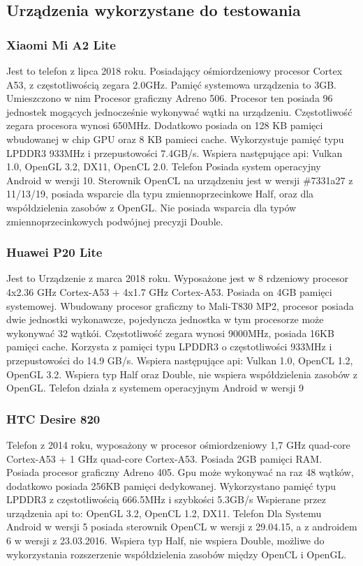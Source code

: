 	
\subsection[Urządzenia wykorzystane do testowania]{Urządzenia wykorzystane do testowania}
\subsubsection[Xiaomi Mi A2 Lite]{Xiaomi Mi A2 Lite}
Jest to telefon z lipca 2018 roku. Posiadający ośmiordzeniowy procesor Cortex A53, z częstotliwością zegara 2.0GHz. Pamięć systemowa urządzenia to 3GB. Umieszczono w nim Procesor graficzny Adreno 506. Procesor ten posiada 96 jednostek mogących jednocześnie wykonywać wątki na urządzeniu. Częstotliwość zegara procesora wynosi 650MHz. Dodatkowo posiada on 128 KB pamięci wbudowanej w chip GPU oraz 8 KB pamieci cache. Wykorzystuje pamięć typu LPDDR3 933MHz i przepustowości 7.4GB/s. Wspiera następujące api: Vulkan 1.0, OpenGL 3.2, DX11, OpenCL 2.0. Telefon Posiada system operacyjny Android w wersji 10. Sterownik OpenCL na urządzeniu jest w wersji \#7331a27 z 11/13/19, posiada wsparcie dla typu zmiennoprzecinkowe Half, oraz dla współdzielenia zasobów z OpenGL. Nie posiada wsparcia dla typów zmiennoprzecinkowych podwójnej precyzji Double.
\subsubsection[Huawei P20 Lite]{Huawei P20 Lite}
Jest to Urządzenie z marca 2018 roku. Wyposażone jest w 8 rdzeniowy procesor 4x2.36 GHz Cortex-A53 + 4x1.7 GHz Cortex-A53. Posiada on 4GB pamięci systemowej. Wbudowany procesor graficzny to Mali-T830 MP2, procesor posiada dwie jednostki wykonawcze, pojedyncza jednostka w tym procesorze może wykonywać 32 wątkói. Częstotliwość zegara wynosi 9000MHz, posiada 16KB pamięci cache. Korzysta z pamięci typu LPDDR3 o częstotliwości 933MHz i przepustowości do 14.9 GB/s. Wspiera następujące api: Vulkan 1.0, OpenCL 1.2, OpenGL 3.2. Wspiera typ Half oraz Double, nie wspiera współdzielenia zasobów z OpenGL. Telefon działa z systemem operacyjnym Android w wersji 9
\subsubsection[HTC Desire 820]{HTC Desire 820}
Telefon z 2014 roku, wyposażony w procesor ośmiordzeniowy 1,7 GHz quad-core Cortex-A53 + 1 GHz quad-core Cortex-A53. Posiada 2GB pamięci RAM. Posiada procesor graficzny Adreno 405. Gpu może wykonywać na raz 48 wątków, dodatkowo posiada 256KB pamięci dedykowanej. Wykorzystano pamięć typu LPDDR3 z częstotliwością 666.5MHz i szybkości 5.3GB/s Wspierane przez urządzenia api to: OpenGL 3.2, OpenCL 1.2, DX11. Telefon Dla Systemu Android w wersji 5 posiada sterownik OpenCL w wersji z 29.04.15, a z androidem 6 w wersji z 23.03.2016. Wspiera typ Half, nie wspiera Double, możliwe do wykorzystania rozszerzenie współdzielenia zasobów między OpenCL i OpenGL.
